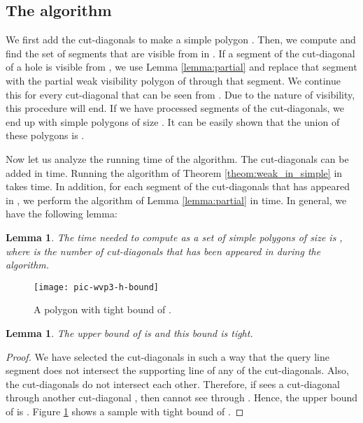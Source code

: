 \documentclass[5p]{elsarticle}
\newtheorem{lemma}[theorem]{Lemma}
\begin{document}
\subsection{The algorithm}
\label{sec:wv3:main-algorithm}
We first add the cut-diagonals to make a simple polygon . 
Then, we compute  and find the set of segments that
are visible from  in . If a segment  of the cut-diagonal of a hole  is visible 
from , we use Lemma \ref{lemma:partial} and replace that segment with the partial
weak visibility polygon of  through that segment. 
We continue this for every cut-diagonal that can be seen from .
Due to the nature of visibility, this procedure will end. If we have processed  
segments of the cut-diagonals, we end up with  simple polygons of size . It can 
be easily shown that the union of these polygons is .

Now let us analyze the running time of the algorithm. 
The cut-diagonals can be added in  time.
Running the algorithm of Theorem \ref{theom:weak_in_simple} in 
takes  time. In addition, for each segment of the cut-diagonals that has appeared in , 
we perform the algorithm of Lemma \ref{lemma:partial} in  time.
In general, we have the following lemma:



\begin{lemma}
\label{lemma:wvp3:primary-result}
The time needed to compute  as a set of  simple polygons
of size  is , where  is the
number of cut-diagonals that has been appeared in  
during the algorithm.
\end{lemma}


\begin{figure}[h]
  \centering
  \texttt{[image: pic-wvp3-h-bound]} 
  \caption{A polygon with tight bound of .}
  \label{fig:wvp3-h-bound}
\end{figure}



\begin{lemma}
The upper bound of  is  and this bound is tight.
\end{lemma}
\begin{proof}
We have selected the cut-diagonals in such a way that 
the query line segment  does not intersect the supporting line of any of 
the cut-diagonals. 
Also, the cut-diagonals do not intersect each other.
Therefore, if  sees a cut-diagonal  through another cut-diagonal , then 
 cannot see  through . Hence, the upper bound of  is . 
Figure \ref{fig:wvp3-h-bound} shows a sample with tight bound of .
\end{proof}
\end{document}
